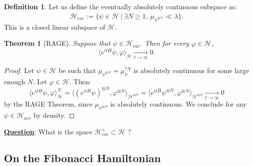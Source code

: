 \documentclass[a4paper]{article}
\newtheorem{theorem}{Theorem}[section]
\theoremstyle{definition}
\newtheorem{definition}{Definition}[section]
\begin{document}
\begin{definition}
Let us define the eventually absolutely continuous subspace as:
$$ \mathcal{H}_{eac} := \overline{ \{ \psi \in \mathcal{H} \ | \ \exists N \geq 1, \ \mu_{\psi^{\otimes N}} \ll \lambda \} }. $$
This is a closed linear subspace of $\mathcal{H}$.
\end{definition}

\begin{theorem}[RAGE]
Suppose that $\psi \in \mathcal{H}_{eac}$. Then for every $\varphi \in \mathcal{H}$, $$ \langle e^{it H} \psi , \varphi \rangle_{\mathcal{H}} \underset{t \rightarrow \infty}{\longrightarrow} 0.$$
\end{theorem}

\begin{proof}
Let $\psi \in \mathcal{H}$ be such that $\mu_{\psi^{\otimes N}} = \mu_\psi^{* N}$ is absolutely continuous for some large enough $N$. Let $\varphi \in \mathcal{H}$. Then:
$$ \langle e^{it H} \psi , \varphi \rangle_{\mathcal{H}}^N = \langle (e^{it H} \psi)^{\otimes N} , \varphi^{\otimes N} \rangle_{\mathcal{H}^{\otimes N}} = \langle e^{it \widehat{H}} \psi^{\otimes N} , \varphi^{\otimes N} \rangle_{\mathcal{H}^{\otimes N}} \underset{t \rightarrow \infty}{\longrightarrow} 0$$
by the RAGE Theorem, since $\mu_{\psi^{\otimes N}}$ is absolutely continuous. We conclude for any $\psi \in \mathcal{H}_{aec}$ by density.
\end{proof}

\underline{\textbf{Question}}:
What is the space $\mathcal{H}_{eac}^\perp \subset \mathcal{H}$ ?

\subsection{On the Fibonacci Hamiltonian}
\end{document}
